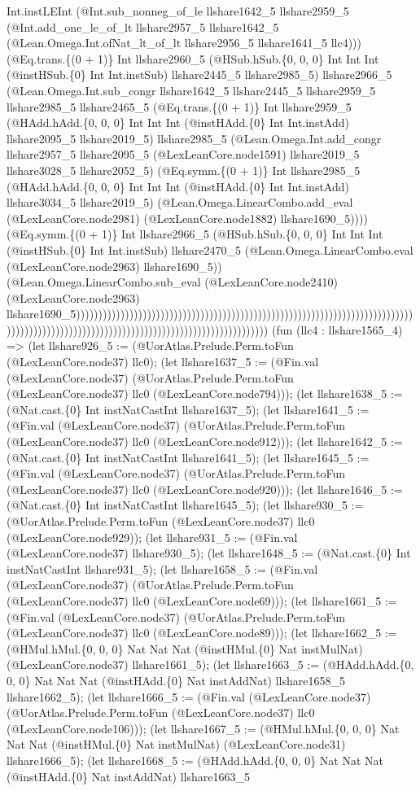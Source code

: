 \documentclass[11pt]{article}
\begin{document}
Int.instLEInt (@Int.sub\_nonneg\_of\_le llshare1642\_5 llshare2959\_5 (@Int.add\_one\_le\_of\_lt llshare2957\_5 llshare1642\_5 (@Lean.Omega.Int.ofNat\_lt\_of\_lt llshare2956\_5 llshare1641\_5 llc4))) (@Eq.trans.\{(0 + 1)\} Int llshare2960\_5 (@HSub.hSub.\{0, 0, 0\} Int Int Int (@instHSub.\{0\} Int Int.instSub) llshare2445\_5 llshare2985\_5) llshare2966\_5 (@Lean.Omega.Int.sub\_congr llshare1642\_5 llshare2445\_5 llshare2959\_5 llshare2985\_5 llshare2465\_5 (@Eq.trans.\{(0 + 1)\} Int llshare2959\_5 (@HAdd.hAdd.\{0, 0, 0\} Int Int Int (@instHAdd.\{0\} Int Int.instAdd) llshare2095\_5 llshare2019\_5) llshare2985\_5 (@Lean.Omega.Int.add\_congr llshare2957\_5 llshare2095\_5 (@LexLeanCore.node1591) llshare2019\_5 llshare3028\_5 llshare2052\_5) (@Eq.symm.\{(0 + 1)\} Int llshare2985\_5 (@HAdd.hAdd.\{0, 0, 0\} Int Int Int (@instHAdd.\{0\} Int Int.instAdd) llshare3034\_5 llshare2019\_5) (@Lean.Omega.LinearCombo.add\_eval (@LexLeanCore.node2981) (@LexLeanCore.node1882) llshare1690\_5)))) (@Eq.symm.\{(0 + 1)\} Int llshare2966\_5 (@HSub.hSub.\{0, 0, 0\} Int Int Int (@instHSub.\{0\} Int Int.instSub) llshare2470\_5 (@Lean.Omega.LinearCombo.eval (@LexLeanCore.node2963) llshare1690\_5)) (@Lean.Omega.LinearCombo.sub\_eval (@LexLeanCore.node2410) (@LexLeanCore.node2963) llshare1690\_5))))))))))))))))))))))))))))))))))))))))))))))))))))))))))))))))))))))))))))))))))))))))))))))))))))))))))))))))))))))))))))))))))))))) (fun (llc4 : llshare1565\_4) => (let llshare926\_5 := (@UorAtlas.Prelude.Perm.toFun (@LexLeanCore.node37) llc0); (let llshare1637\_5 := (@Fin.val (@LexLeanCore.node37) (@UorAtlas.Prelude.Perm.toFun (@LexLeanCore.node37) llc0 (@LexLeanCore.node794))); (let llshare1638\_5 := (@Nat.cast.\{0\} Int instNatCastInt llshare1637\_5); (let llshare1641\_5 := (@Fin.val (@LexLeanCore.node37) (@UorAtlas.Prelude.Perm.toFun (@LexLeanCore.node37) llc0 (@LexLeanCore.node912))); (let llshare1642\_5 := (@Nat.cast.\{0\} Int instNatCastInt llshare1641\_5); (let llshare1645\_5 := (@Fin.val (@LexLeanCore.node37) (@UorAtlas.Prelude.Perm.toFun (@LexLeanCore.node37) llc0 (@LexLeanCore.node920))); (let llshare1646\_5 := (@Nat.cast.\{0\} Int instNatCastInt llshare1645\_5); (let llshare930\_5 := (@UorAtlas.Prelude.Perm.toFun (@LexLeanCore.node37) llc0 (@LexLeanCore.node929)); (let llshare931\_5 := (@Fin.val (@LexLeanCore.node37) llshare930\_5); (let llshare1648\_5 := (@Nat.cast.\{0\} Int instNatCastInt llshare931\_5); (let llshare1658\_5 := (@Fin.val (@LexLeanCore.node37) (@UorAtlas.Prelude.Perm.toFun (@LexLeanCore.node37) llc0 (@LexLeanCore.node69))); (let llshare1661\_5 := (@Fin.val (@LexLeanCore.node37) (@UorAtlas.Prelude.Perm.toFun (@LexLeanCore.node37) llc0 (@LexLeanCore.node89))); (let llshare1662\_5 := (@HMul.hMul.\{0, 0, 0\} Nat Nat Nat (@instHMul.\{0\} Nat instMulNat) (@LexLeanCore.node37) llshare1661\_5); (let llshare1663\_5 := (@HAdd.hAdd.\{0, 0, 0\} Nat Nat Nat (@instHAdd.\{0\} Nat instAddNat) llshare1658\_5 llshare1662\_5); (let llshare1666\_5 := (@Fin.val (@LexLeanCore.node37) (@UorAtlas.Prelude.Perm.toFun (@LexLeanCore.node37) llc0 (@LexLeanCore.node106))); (let llshare1667\_5 := (@HMul.hMul.\{0, 0, 0\} Nat Nat Nat (@instHMul.\{0\} Nat instMulNat) (@LexLeanCore.node31) llshare1666\_5); (let llshare1668\_5 := (@HAdd.hAdd.\{0, 0, 0\} Nat Nat Nat (@instHAdd.\{0\} Nat instAddNat) llshare1663\_5 
\end{document}
